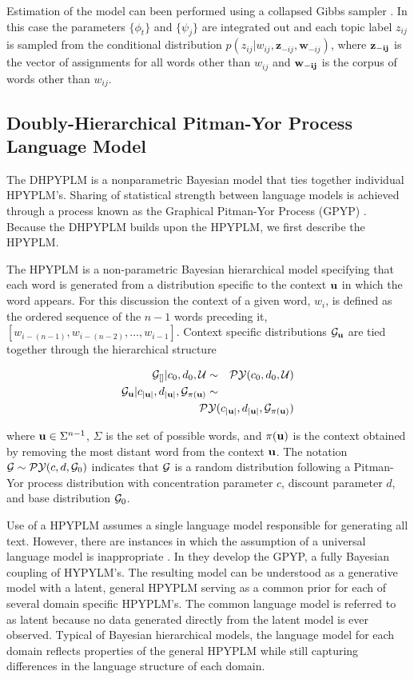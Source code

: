 Estimation of the model can been performed using a collapsed Gibbs sampler \cite{Griffiths2004}.  In this case the parameters $\{ \phi_t \}$ and $\{ \psi_j \}$ are integrated out and each topic label $z_{ij}$ is sampled from the conditional distribution $p(z_{ij} | w_{ij}, \mathbf{z}_{-ij}, \mathbf{w}_{-ij})$, where $\bf{z_{-ij}}$ is the vector of assignments for all words other than $w_{ij}$ and $\bf{w_{-ij}}$ is the corpus of words other than $w_{ij}$.

\subsection{Doubly-Hierarchical Pitman-Yor Process Language Model}

The DHPYPLM is a nonparametric Bayesian model that ties together individual HPYPLM's. Sharing of statistical strength between language models is achieved through a process known as the Graphical Pitman-Yor Process (GPYP) \cite{Wood2009a}.  Because the DHPYPLM builds upon the HPYPLM, we first describe the HPYPLM.

The HPYPLM is a non-parametric Bayesian hierarchical model specifying that each word is generated from a distribution specific to the context ${\bf u}$ in which the word appears.  For this discussion the context of a given word, $w_i$, is  defined as the ordered sequence of the $n-1$ words preceding it, $[w_{i - (n-1)}, w_{i-(n-2)}, \ldots, w_{i-1}]$.  Context specific distributions $\G_{\bu}$ are tied together through the hierarchical structure

\begin{eqnarray}
\G_{[]}| c_0, d_0, \mathcal{U} &\sim& \PY(c_0, d_0, \mathcal{U}) \nonumber \\
\G_\bu | c_{|\bu|}, d_{|\bu|}, \G_{\pi (\bu)} &\sim&  \nonumber \\
& & \hspace{-1cm} \PY( c_{|\bu|}, d_{|\bu|},  \G_{\pi (\bu)})  \label{eqn:hpyplm}
\end{eqnarray}

where $\bu \in \Sigma^{n-1}$, $\Sigma$ is the set of possible words, and $\pi(\bu)$ is the context obtained by removing the most distant word from the context $\bu$.  The notation $\G \sim \PY(c,d,\G_0)$ indicates that $\G$ is a random distribution following a Pitman-Yor process distribution with concentration parameter $c$, discount parameter $d$, and base distribution $\G_0$.

Use of a HPYPLM assumes a single language model responsible for generating all text.  However, there are instances in which the assumption of a universal language model is inappropriate \cite{Rosenfeld2000}.  In \cite{Wood2009a} they develop the GPYP, a fully Bayesian coupling of HYPYLM's. The resulting model can be understood as a generative model with a latent, general HPYPLM serving as a common prior for each of several domain specific HPYPLM's.  The common language model is referred to as latent because no data generated directly from the latent model is ever observed.  Typical of Bayesian hierarchical models, the language model for each domain reflects properties of the general HPYPLM while still capturing differences in the language structure of each domain.  

